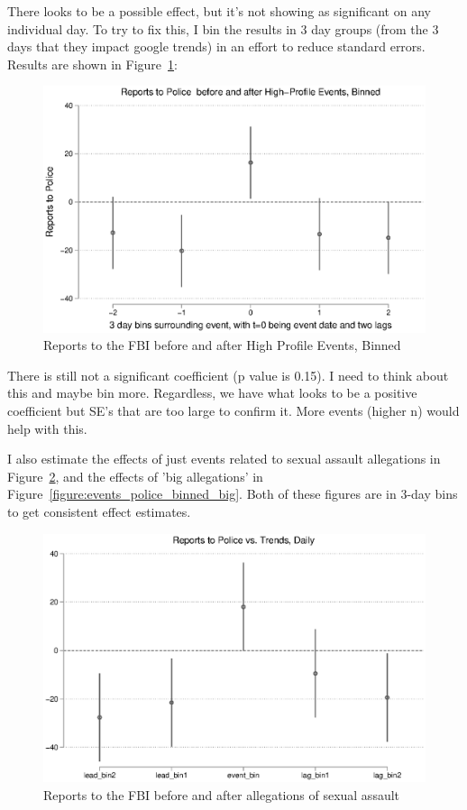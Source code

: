 \documentclass[AER,draftmode]{AEA}
\begin{document}
There looks to be a possible effect, but it's not showing as significant on any individual day. To try to fix this, I bin the results in 3 day groups (from the 3 days that they impact google trends) in an effort to reduce standard errors. Results are shown in Figure~\ref{figure:events_police_binned}:

\begin{figure}
\includegraphics[width=\linewidth]{figures/events_police_binned.eps}
\caption{Reports to the FBI before and after High Profile Events, Binned} \label{figure:events_police_binned}
\end{figure}

There is still not a significant coefficient (p value is 0.15). I need to think about this and maybe bin more. Regardless, we have what looks to be a positive coefficient but SE's that are too large to confirm it. More events (higher n) would help with this.

I also estimate the effects of just events related to sexual assault allegations in Figure~\ref{figure:events_police_binned_alle}, and the effects of 'big allegations' in Figure~\ref{figure:events_police_binned_big}. Both of these figures are in 3-day bins to get consistent effect estimates.

\begin{figure}
\includegraphics[width=\linewidth]{figures/events_police_binned_alle.eps}
\caption{Reports to the FBI before and after allegations of sexual assault}\label{figure:events_police_binned_alle}
\end{figure}
\end{document}
